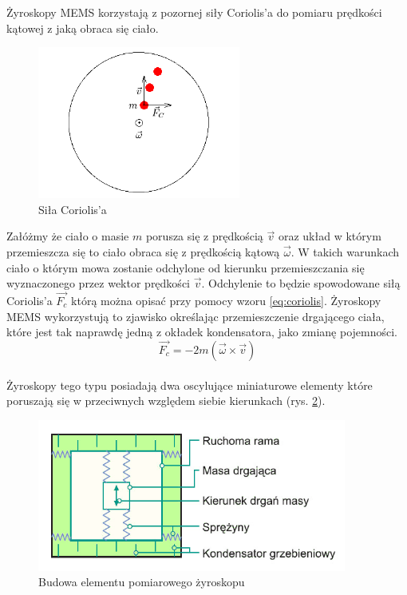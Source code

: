 Żyroskopy MEMS korzystają z pozornej siły Coriolis'a do pomiaru prędkości kątowej z jaką obraca się ciało.
\begin{figure}[!ht]
 \centering
 \includegraphics[height=50mm]{../images/ch04/coriolis.png}
 \caption{Siła Coriolis'a}
 \label{fig:Coriolis}
\end{figure}
Załóżmy że ciało o masie $m$ porusza się z prędkością $\vec{v}$ oraz układ w którym przemieszcza się to ciało obraca się z prędkością kątową $\vec{\omega}$. W takich warunkach ciało o którym mowa zostanie odchylone od kierunku przemieszczania się wyznaczonego przez wektor prędkości $\vec{v}$. Odchylenie to będzie spowodowane siłą Coriolis'a $\vec{F_{c}}$ którą można opisać przy pomocy wzoru \ref{eq:coriolis}. Żyroskopy MEMS wykorzystują to zjawisko określając przemieszczenie drgającego ciała, które jest tak naprawdę jedną z okładek kondensatora, jako zmianę pojemności.
\begin{equation}
  \label{eq:coriolis}
  \vec{F_{c}} = -2m \left(\vec{\omega}\times\vec{v}\right)
\end{equation}
\\
Żyroskopy tego typu posiadają dwa oscylujące miniaturowe elementy które poruszają się w przeciwnych względem siebie kierunkach (rys. \ref{fig:ZyroOsc}). 
\begin{figure}[!ht]
 \centering
 \includegraphics[height=50mm]{../images/ch04/mems_osc.jpg}
 \caption{Budowa elementu pomiarowego żyroskopu\cite{website::elektronikab2b.pl}}
 \label{fig:ZyroOsc}
\end{figure}

